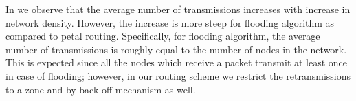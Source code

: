 In  we observe that the average number of transmissions increases with increase in network density. However, the increase is more steep for flooding algorithm as compared to petal routing. Specifically, for flooding algorithm, the average number of transmissions is roughly equal to the number of nodes in the network. This is expected since all the nodes which receive a packet transmit at least once in case of flooding; however, in our routing scheme we restrict the retransmissions to a zone and by back-off mechanism as well.

